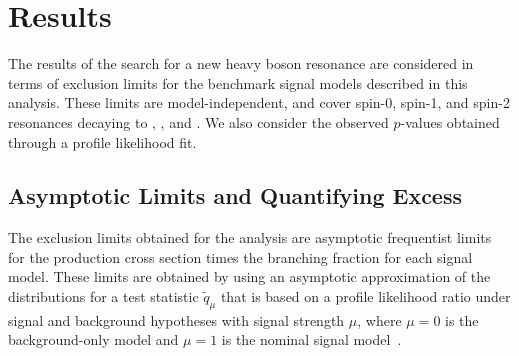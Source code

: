 
\section{Results}
\label{sec:results}

The results of the search for a new heavy boson resonance are considered in terms of exclusion limits for the benchmark signal models described in this analysis.
These limits are model-independent, and cover spin-0, spin-1, and spin-2 resonances decaying to \WW, \WZ, and \WH.
We also consider the observed $p$-values obtained through a profile likelihood fit.

\subsection{Asymptotic Limits and Quantifying Excess}

The exclusion limits obtained for the analysis are asymptotic frequentist limits for the production cross section times the branching fraction for each signal model.
These limits are obtained by using an asymptotic approximation of the distributions for a test statistic $\tilde{q}_\mu$ that is based on a profile likelihood ratio under signal and background hypotheses with signal strength $\mu$, where $\mu=0$ is the background-only model and $\mu=1$ is the nominal signal model~\cite{Cowan_2011,CMS-NOTE-2011-005}.

